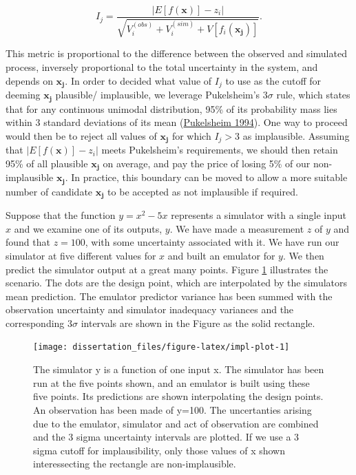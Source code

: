 \documentclass[
  12pt,
  a4paper,
  twoside]{book}
\begin{document}
\begin{equation}
\label{eq:one-d-implausibility}
I_j = \frac{|E[f(\mathbf{x})] - z_i|}{\sqrt{V_i^{(obs)} + V_i^{(sim)} + V[f_i(\mathbf{x_j})]}}.
\end{equation}

This metric is proportional to the difference between the observed and simulated process, inversely proportional to the total uncertainty in the system, and depends on \(\mathbf{x_j}\). In order to decided what value of \(I_j\) to use as the cutoff for deeming \(\mathbf{x_j}\) plausible/ implausible, we leverage Pukelsheim's \(3\sigma\) rule, which states that for any continuous unimodal distribution, 95\% of its probability mass lies within 3 standard deviations of its mean (\protect\hyperlink{ref-three_sigma}{Pukelsheim 1994}). One way to proceed would then be to reject all values of \(\mathbf{x_j}\) for which \(I_j > 3\) as implausible. Assuming that \(|E[f(\mathbf{x})] - z_i|\) meets Pukelsheim's requirements, we should then retain 95\% of all plausible \(\mathbf{x_j}\) on average, and pay the price of losing 5\% of our non-implausible \(\mathbf{x_j}\). In practice, this boundary can be moved to allow a more suitable number of candidate \(\mathbf{x_j}\) to be accepted as not implausible if required.

Suppose that the function \(y = x^2-5x\) represents a simulator with a single input \(x\) and we examine one of its outputs, \(y\). We have made a measurement \(z\) of \(y\) and found that \(z=100\), with some uncertainty associated with it. We have run our simulator at five different values for \(x\) and built an emulator for \(y\). We then predict the simulator output at a great many points. Figure \ref{fig:impl-plot} illustrates the scenario. The dots are the design point, which are interpolated by the simulators mean prediction. The emulator predictor variance has been summed with the observation uncertainty and simulator inadequacy variances and the corresponding 3\(\sigma\) intervals are shown in the Figure as the solid rectangle.

\begin{figure}[H]

{\centering \texttt{[image: dissertation\_files/figure-latex/impl-plot-1]} 

}

\caption{The simulator y is a function of one input x. The simulator has been run at the five points shown, and an emulator is built using these five points. Its predictions are shown interpolating the design points. An observation has been made of y=100. The uncertanties arising due to the emulator, simulator and act of observation are combined and the 3 sigma uncertainty intervals are plotted. If we use a 3 sigma cutoff for implausibility, only those values of x shown interessecting the rectangle are non-implausible. }\label{fig:impl-plot}
\end{figure}
\end{document}

